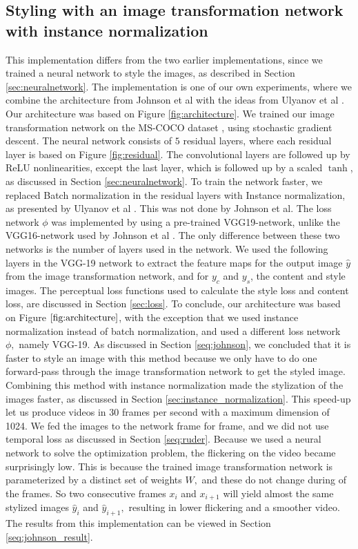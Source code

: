 \subsection{Styling with an image transformation network with instance normalization}
\label{seq:johnson_method}
This implementation differs from the two earlier implementations, since we trained a neural network to style the images, as described in Section \ref{sec:neuralnetwork}. The implementation is one of our own experiments, where we combine the architecture from Johnson et al \cite{Johnson:1} with the ideas from Ulyanov et al \cite{Ulyanov:1}. Our architecture was based on Figure \ref{fig:architecture}. We trained our image transformation network on the MS-COCO dataset \cite{Coco:1}, using stochastic gradient descent. The neural network consists of $5$ residual layers, where each residual layer is based on Figure \ref{fig:residual}. The convolutional layers are followed up by ReLU nonlinearities, except the last layer, which is followed up by a scaled $\tanh$, as discussed in Section \ref{sec:neuralnetwork}. To train the network faster, we replaced Batch normalization in the residual layers with Instance normalization, as presented by Ulyanov et al \cite{Ulyanov:1}. This was not done by Johnson et al.\newline\newline 
The loss network $\phi$ was implemented by using a pre-trained VGG19-network, unlike the VGG16-network used by Johnson et al \cite{Johnson:1}. The only difference between these two networks is the number of layers used in the network. We used the following layers in the VGG-19 network to extract the feature maps for the output image $\hat{y}$ from the image transformation network, and for $y_c$ and $y_s$, the content and style images. The perceptual loss functions used to calculate the style loss and content loss, are discussed in Section \ref{sec:loss}.\newline\newline
To conclude, our architecture was based on Figure $\ref{fig:architecture}$, with the exception that we used instance normalization instead of batch normalization, and used a different loss network $\phi,$ namely VGG-19. As discussed in Section \ref{seq:johnson}, we concluded that it is faster to style an image with this method because we only have to do one forward-pass through the image transformation network to get the styled image. Combining this method with instance normalization made the stylization of the images faster, as discussed in Section \ref{sec:instance_normalization}. This speed-up let us produce videos in $30$ frames per second with a maximum dimension of 1024. We fed the images to the network frame for frame, and we did not use temporal loss as discussed in Section \ref{seq:ruder}. Because we used a neural network to solve the optimization problem, the flickering on the video became surprisingly low. This is because the trained image transformation network is parameterized by a distinct set of weights $W,$ and these do not change during of the frames. So two consecutive frames $x_i$ and $x_{i+1}$ will yield almost the same stylized images $\hat{y}_i$ and $\hat{y}_{i+1},$ resulting in lower flickering and a smoother video. The results from this implementation can be viewed in Section \ref{seq:johnson_result}.